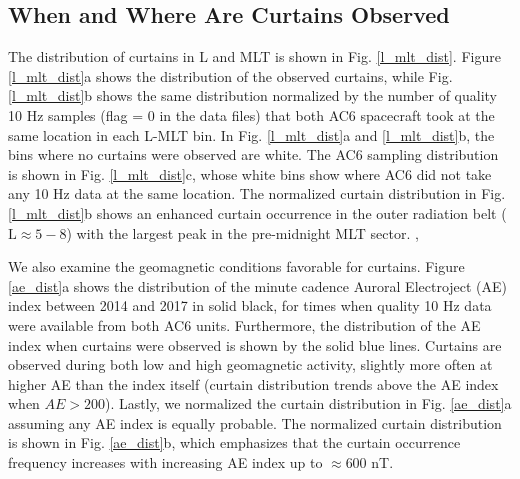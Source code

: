 \documentclass[draft]{agujournal2019}
\begin{document}
\subsection{When and Where Are Curtains Observed}
The distribution of curtains in L and MLT is shown in Fig. \ref{l_mlt_dist}. Figure \ref{l_mlt_dist}a shows the distribution of the observed curtains, while Fig. \ref{l_mlt_dist}b shows the same distribution normalized by the number of quality 10 Hz samples (flag = 0 in the data files) that both AC6 spacecraft took at the same location in each L-MLT bin. In Fig. \ref{l_mlt_dist}a and \ref{l_mlt_dist}b, the bins where no curtains were observed are white. The AC6 sampling distribution is shown in Fig. \ref{l_mlt_dist}c, whose white bins show where AC6 did not take any 10 Hz data at the same location. The normalized curtain distribution in Fig. \ref{l_mlt_dist}b shows an enhanced curtain occurrence in the outer radiation belt ($ \mathrm{L} \approx 5-8$) with the largest peak in the pre-midnight MLT sector.  \cite<Figure 2 in>{O'brien2019}, 

We also examine the geomagnetic conditions favorable for curtains. Figure \ref{ae_dist}a shows the distribution of the minute cadence Auroral Electroject (AE) index between 2014 and 2017 in solid black, for times when quality 10 Hz data were available from both AC6 units. Furthermore, the distribution of the AE index when curtains were observed is shown by the solid blue lines. Curtains are observed during both low and high geomagnetic activity, slightly more often at higher AE than the index itself (curtain distribution trends above the AE index when $AE > 200$). Lastly, we normalized the curtain distribution in Fig. \ref{ae_dist}a assuming any AE index is equally probable. The normalized curtain distribution is shown in Fig. \ref{ae_dist}b, which emphasizes that the curtain occurrence frequency increases with increasing AE index up to $\approx 600$ nT.
\end{document}
